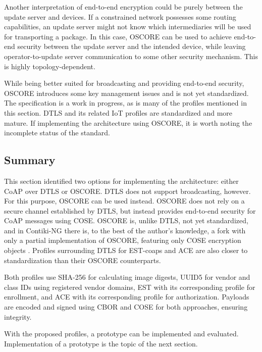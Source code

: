 \documentclass[0-thesis.tex]{subfiles}
\begin{document}
Another interpretation of end-to-end encryption could be purely between the update server
and devices. If a constrained network possesses some routing capabilities, an update
server might not know which intermediaries will be used for transporting a package. In
this case, OSCORE can be used to achieve end-to-end security between the update server and
the intended device, while leaving operator-to-update server communication to some other
security mechanism. This is highly topology-dependent.

While being better suited for broadcasting and providing end-to-end security, OSCORE
introduces some key management issues and is not yet standardized. The specification
\parencite{oscore} is a work in progress, as is many of the profiles mentioned in this
section. DTLS and its related IoT profiles are standardized and more mature. If
implementing the architecture using OSCORE, it is worth noting the incomplete status of
the standard.

\subsection{Summary}
\label{ssec:profiles-summary}
This section identified two options for implementing the architecture: either CoAP over
DTLS or OSCORE. DTLS does not support broadcasting, however. For this purpose, OSCORE can
be used instead. OSCORE does not rely on a secure channel established by DTLS, but instead
provides end-to-end security for CoAP messages using COSE. OSCORE is, unlike DTLS, not yet
standardized, and in Contiki-NG there is, to the best of the author's knowledge, a fork
with only a partial implementation of OSCORE, featuring only COSE encryption objects
\parencite{contiki-oscore}. Profiles surrounding DTLS for EST-coaps and ACE are also
closer to standardization than their OSCORE counterparts.

Both profiles use SHA-256 for calculating image digests, UUID5 for vendor and class IDs
using registered vendor domains, EST with its corresponding profile for enrollment, and
ACE with its corresponding profile for authorization. Payloads are encoded and signed
using CBOR and COSE for both approaches, ensuring integrity.

With the proposed profiles, a prototype can be implemented and evaluated. Implementation
of a prototype is the topic of the next section.
\end{document}
